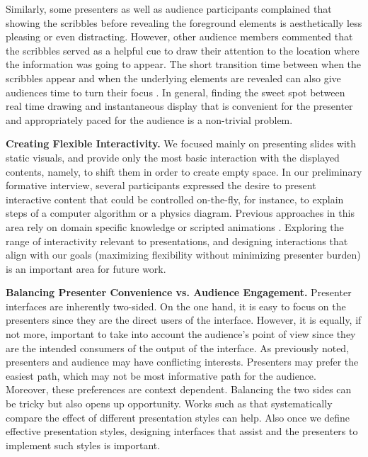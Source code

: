 Similarly, some presenters as well as audience participants complained that showing the scribbles before revealing the foreground elements is aesthetically less pleasing or even distracting. However, other audience members commented that the scribbles served as a helpful cue to draw their attention to the location where the information was going to appear. The short transition time between when the scribbles appear and when the underlying elements are revealed can also give audiences time to turn their focus  . In general, finding the sweet spot between real time drawing and instantaneous display that is convenient for the presenter and appropriately paced for the audience is a non-trivial problem.

\textbf{Creating Flexible Interactivity.} We focused mainly on presenting slides with static visuals, and provide only the most basic interaction with the displayed contents, namely, to shift them in order to create empty space. In our preliminary formative interview, several participants expressed the desire to present interactive content that could be controlled on-the-fly, for instance, to explain steps of a computer algorithm or a physics diagram. Previous approaches in this area rely on domain specific knowledge \cite{laviola2007mathpad,alvarado2001preserving} or scripted animations \cite{zongker2003creating}.  Exploring the range of interactivity relevant to presentations, and designing interactions that align with our goals (maximizing flexibility without minimizing presenter burden) is an important area for future work. 

\textbf{Balancing Presenter Convenience vs. Audience Engagement.} Presenter interfaces are inherently two-sided. On the one hand, it is easy to focus on the presenters since they are the direct users of the interface. However, it is equally, if not more, important to take into account the audience's point of view since they are the intended consumers of the output of the interface. As previously noted, presenters and audience may have conflicting interests. Presenters may prefer the easiest path, which may not be most informative path for the audience. Moreover, these preferences are context dependent.  Balancing the two sides can be tricky but also opens up opportunity. Works such as \cite{seth2010powerpoint, cross2013typerighting} that systematically compare the effect of different presentation styles can help. Also once we define effective presentation styles, designing interfaces that assist and  the presenters to implement such styles is important. 
